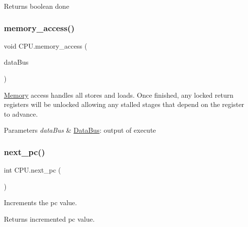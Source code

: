 \begin{DoxyReturn}{Returns}
boolean done 
\end{DoxyReturn}
\mbox{\label{class_c_p_u_ab50af6d8dde2323a1ceea8c58e3ce5a8}} 
\subsubsection{\texorpdfstring{memory\+\_\+access()}{memory\_access()}}
{\footnotesize\ttfamily void C\+P\+U.\+memory\+\_\+access (\begin{DoxyParamCaption}\item[{\mbox{\hyperlink{class_data_bus}{Data\+Bus}}}]{data\+Bus }\end{DoxyParamCaption})\hspace{0.3cm}{\ttfamily [private]}}

\mbox{\hyperlink{class_memory}{Memory}} access handles all stores and loads. Once finished, any locked return registers will be unlocked allowing any stalled stages that depend on the register to advance.


\begin{DoxyParams}{Parameters}
{\em data\+Bus} & \mbox{\hyperlink{class_data_bus}{Data\+Bus}}\+: output of execute \\
\hline
\end{DoxyParams}
\mbox{\label{class_c_p_u_a9926463b06331bffb789febcf3cd102f}} 
\subsubsection{\texorpdfstring{next\+\_\+pc()}{next\_pc()}}
{\footnotesize\ttfamily int C\+P\+U.\+next\+\_\+pc (\begin{DoxyParamCaption}{ }\end{DoxyParamCaption})\hspace{0.3cm}{\ttfamily [private]}}

Increments the pc value. \begin{DoxyReturn}{Returns}
incremented pc value. 
\end{DoxyReturn}
\mbox{\label{class_c_p_u_ae2b2850e5cec1defd6072a965d9435b3}} 
